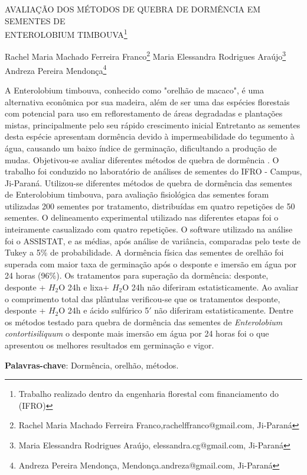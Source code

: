 \documentclass[article,12pt,onesidea,4paper,english,brazil]{abntex2}
\begin{document}
	
	
	\frenchspacing 
	
	\begin{center}
		\LARGE AVALIAÇÃO DOS MÉTODOS DE QUEBRA DE DORMÊNCIA EM SEMENTES DE\\
		ENTEROLOBIUM TIMBOUVA\footnote{Trabalho realizado dentro da engenharia florestal com financiamento do (IFRO)}
		
		\normalsize
		Rachel Maria Machado Ferreira Franco\footnote{Rachel Maria Machado Ferreira Franco,rachelffranco@gmail.com, Ji-Paraná} 
		Maria Elessandra Rodrigues Araújo\footnote{Maria Elessandra Rodrigues Araújo, elessandra.cg@gmail.com, Ji-Paraná} \\
		Andreza Pereira
		Mendonça\footnote{Andreza Pereira Mendonça, Mendonça.andreza@gmail.com, Ji-Paraná} 
		
	\end{center}
	
	\noindent A Enterolobium timbouva, conhecido como "orelhão de macaco", é uma alternativa
	econômica por sua madeira, além de ser uma das espécies florestais com potencial
	para uso em reflorestamento de áreas degradadas e plantações mistas,
	principalmente pelo seu rápido crescimento inicial Entretanto as sementes desta
	espécie apresentam dormência devido à impermeabilidade do tegumento à água,
	causando um baixo índice de germinação, dificultando a produção de mudas.
	Objetivou-se avaliar diferentes métodos de quebra de dormência . O trabalho foi
	conduzido no laboratório de análises de sementes do IFRO - Campus, Ji-Paraná.
	Utilizou-se diferentes métodos de quebra de dormência das sementes de
	Enterolobium timbouva, para avaliação fisiológica das sementes foram utilizadas
	200 sementes por tratamento, distribuídas em quatro repetições de 50 sementes. O
	delineamento experimental utilizado nas diferentes etapas foi o inteiramente
	casualizado com quatro repetições. O software utilizado na análise foi o ASSISTAT,
	e as médias, após análise de variância, comparadas pelo teste de Tukey a 5\% de
	probabilidade. A dormência física das sementes de orelhão foi superada com maior
	taxa de germinação após o desponte e imersão em água por 24 horas (96\%). Os
	tratamentos para superação da dormência: desponte, desponte + $H_2$O 24h e lixa+
	$H_2$O 24h não diferiram estatisticamente. Ao avaliar o comprimento total das
	plântulas verificou-se que os tratamentos desponte, desponte + $H_2$O 24h e ácido
	sulfúrico 5$'$ não diferiram estatisticamente. Dentre os métodos testado para quebra
	de dormência das sementes de \textit{Enterolobium contortisiliquum} o desponte mais
	imersão em água por 24 horas foi o que apresentou os melhores resultados em
	germinação e vigor.
	
	\vspace{\onelineskip}
	
	\noindent
	\textbf{Palavras-chave}: Dormência, orelhão, métodos.
	
\end{document}
